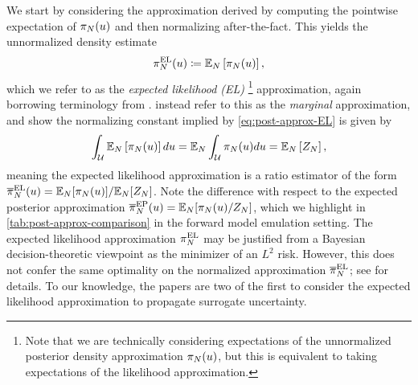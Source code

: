 \documentclass[12pt]{article}
\begin{document}
We start by considering the approximation derived by computing the pointwise expectation 
of $\postEm(\Par)$ and then normalizing after-the-fact.
This yields the unnormalized density estimate
\begin{align}
\postApproxMarg[\Ndesign](\Par) \Def \E_{\Ndesign}\left[\postEm[\Ndesign](\Par) \right], \label{eq:post-approx-EL}
\end{align}
which we refer to as the \textit{expected likelihood (EL)}
\footnote{Note that we are technically considering expectations of the unnormalized posterior density approximation 
$\postEm[\Ndesign](\Par)$, but this is equivalent to taking expectations of the likelihood approximation.}
approximation, again borrowing terminology from
 \citet{BurknerSurrogate}. \citet{StuartTeck1} instead refer to this as the \textit{marginal} approximation, 
 and show the normalizing constant implied by \cref{eq:post-approx-EL} is given by
 \begin{equation}
 \int_{\parSpace} \E_{\Ndesign}\left[\postEm[\Ndesign](\Par) \right] d\Par 
 = \E_{\Ndesign} \int_{\parSpace} \postEm[\Ndesign](\Par) d\Par
 = \E_{\Ndesign}\left[\normCstEm \right],
 \end{equation} 
meaning the expected likelihood approximation is a ratio estimator of the form 
 $\postApproxNormMarg[\Ndesign](\Par) = \E_{\Ndesign}[\postEm[\Ndesign](\Par)] / \E_{\Ndesign}[\normCstEm]$.
 Note the difference with respect to the expected posterior approximation 
 $\postApproxEP[\Ndesign](\Par) = \E_{\Ndesign}[\postEm[\Ndesign](\Par) / \normCstEm]$, 
 which we highlight in \cref{tab:post-approx-comparison} in the forward model emulation setting.  
 The expected likelihood approximation $\postApproxMarg[\Ndesign]$ may be justified from a Bayesian
 decision-theoretic viewpoint as the minimizer of an $L^2$ risk. However, this does not 
 confer the same optimality on the normalized approximation $\postApproxNormMarg[\Ndesign]$;
 see \citep{SinsbeckNowak,StuartTeck2,VehtariParallelGP} for details. To our knowledge, the papers
 \citep{SinsbeckNowak,StuartTeck1} are two of the first to consider the expected likelihood approximation
 to propagate surrogate uncertainty.
 
\end{document}
